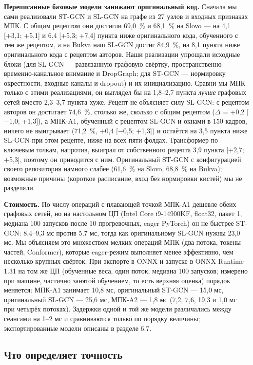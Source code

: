 \documentclass[a4paper,fleqn]{cas-dc}
\begin{document}
\textbf{Переписанные базовые модели занижают оригинальный код.} Сначала мы сами реализовали ST-GCN и SL-GCN на графе из 27 узлов и входных признаках МПК. С общим рецептом они достигли 69,0~\% и 68,1~\% на Slovo --- на 4,1 {[}+3,1; +5,1{]} и 6,4 {[}+5,3; +7,4{]} пункта ниже оригинального кода, обученного с тем же рецептом, а на Bukva наш SL-GCN достиг 84,9~\%, на 8,1 пункта ниже оригинального кода с рецептом авторов. Наши реализации упрощали исходные блоки (для SL-GCN --- развязанную графовую свёртку, пространственно-временно-канальное внимание и DropGraph; для ST-GCN --- нормировку окрестности, входные каналы и dropout) и их инициализацию. Сравни мы МПК только с этими реализациями, он выглядел бы на 1,8--2,7 пункта \emph{лучше} графовых сетей вместо 2,3--3,7 пункта хуже. Рецепт не объясняет силу SL-GCN: с рецептом авторов он достигает 74,6~\%, столько же, сколько с общим рецептом (\(\Delta\) = +0,2 {[}$-$1,0; +1,3{]}), а МПК-A1, обученный с рецептом SL-GCN и окнами в 150 кадров, ничего не выигрывает (71,2~\%, +0,4 {[}$-$0,5; +1,3{]}) и остаётся на 3,5 пункта ниже SL-GCN при этом рецепте, ниже на всех пяти фолдах. Трансформер по ключевым точкам, напротив, выиграл от собственного рецепта 3,9 пункта {[}+2,7; +5,3{]}, поэтому он приводится с ним. Оригинальный ST-GCN с конфигурацией своего репозитория намного слабее (61,6~\% на Slovo, 68,8~\% на Bukva); возможные причины (короткое расписание, вход без нормировки кистей) мы не разделяли.

\textbf{Стоимость.} По числу операций с плавающей точкой МПК-A1 дешевле обеих графовых сетей, но на настольном ЦП (Intel Core i9-14900KF, float32, пакет 1, медиана 100 запусков после 10 прогревочных, eager PyTorch) он не быстрее ST-GCN: 8,4--9,3 мс против 5,7 мс, тогда как оригинальному SL-GCN нужны 23,0 мс. Мы объясняем это множеством мелких операций МПК (два потока, токены частей, Conformer), которые eager-режим выполняет менее эффективно, чем несколько крупных свёрток. При экспорте в ONNX и запуске в ONNX Runtime 1.31 на том же ЦП (обученные веса, один поток, медиана 100 запусков; измерено при машине, частично занятой обучением, то есть верхняя оценка) порядок меняется: МПК-A1 занимает 10,8 мс, оригинальный ST-GCN --- 15,0 мс, оригинальный SL-GCN --- 25,6 мс, МПК-A2 --- 1,8 мс (7,2, 7,6, 19,3 и 1,0 мс при четырёх потоках). Задержки одной и той же модели различались между сеансами на 1--2 мс и сравниваются только по порядку величины; экспортированные модели описаны в разделе 6.7.

\hypertarget{ux447ux442ux43e-ux43eux43fux440ux435ux434ux435ux43bux44fux435ux442-ux442ux43eux447ux43dux43eux441ux442ux44c}{%
\subsection{Что определяет точность}\label{ux447ux442ux43e-ux43eux43fux440ux435ux434ux435ux43bux44fux435ux442-ux442ux43eux447ux43dux43eux441ux442ux44c}}
\end{document}
